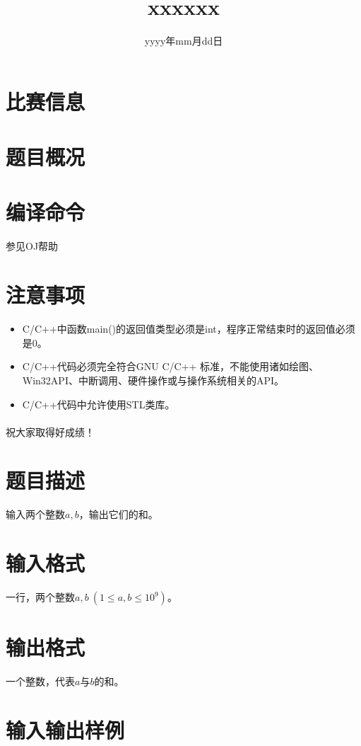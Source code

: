 \documentclass{ctpro}
\title{xxxxxx}
\date{yyyy年mm月dd日}
\begin{document}
\maketitle
{}

\section*{比赛信息}

\section*{题目概况}
\problemtab

\section*{编译命令}
参见OJ帮助

\section*{注意事项}
\begin{itemize}
	\item C/C++中函数main()的返回值类型必须是int，程序正常结束时的返回值必须是0。
	\item C/C++代码必须完全符合GNU C/C++ 标准，不能使用诸如绘图、Win32API、中断调用、硬件操作或与操作系统相关的API。
	\item C/C++代码中允许使用STL类库。
\end{itemize}

\paragraph*{} 祝大家取得好成绩！

\makeproblem
\section*{题目描述}
输入两个整数$a,b$，输出它们的和。

\section*{输入格式}
一行，两个整数$a,b~(1 \leq a,b \leq 10^9)$。

\section*{输出格式}
一个整数，代表$a$与$b$的和。

\section*{输入输出样例}
\end{document}
